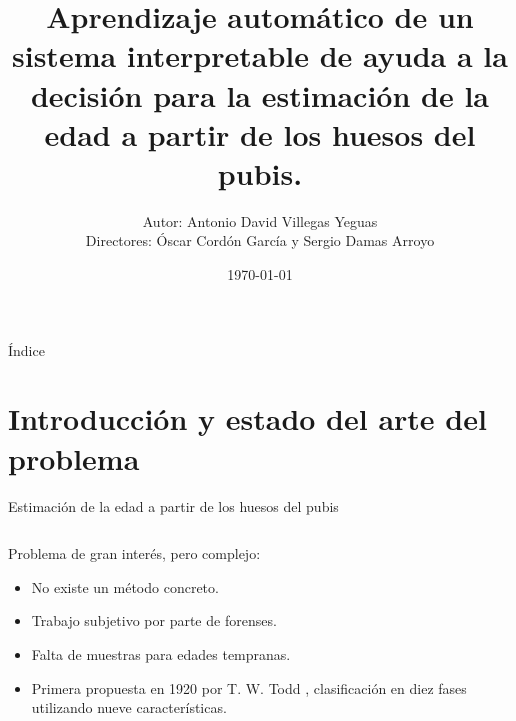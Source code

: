 \documentclass{beamer}
\title{Aprendizaje automático de un sistema interpretable de ayuda a la decisión para la estimación de la edad a partir de los huesos del pubis.}
\date{\today}
\author{\small Autor: Antonio David Villegas Yeguas \\ Directores: Óscar Cordón García y Sergio Damas Arroyo}
\institute[UGR]{Universidad de Granada\\
\medskip
\textit{advy99@correo.ugr.es}\\
\medskip
\url{https://github.com/advy99/TFG}
\doclicenseThis
}
\begin{document}
 \maketitle

\begin{frame}{Índice}
\tableofcontents
\end{frame}




\section{Introducción y estado del arte del problema}
\begin{frame}{Estimación de la edad a partir de los huesos del pubis}

	\begin{columns}[T]
		\begin{column}{.4\textwidth}
			Problema de gran interés, pero complejo:
			\begin{itemize}
				\item No existe un método concreto.
				\item Trabajo subjetivo por parte de forenses.
				\item Falta de muestras para edades tempranas.
				\item Primera propuesta en 1920 por T. W. Todd \cite{todd}, clasificación en diez fases utilizando nueve características.
			\end{itemize}

		\end{column}


\end{columns}
\end{frame}
\end{document}

